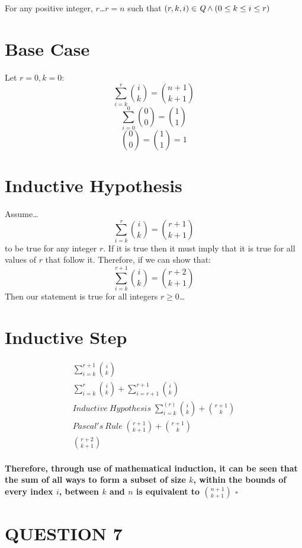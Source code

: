 \documentclass{amsart}
\theoremstyle{definition}
\theoremstyle{remark}
\numberwithin{equation}{section}
\begin{document}
\begin{itemize}
For any positive integer, $r$\dots\newline$r = n$ such that $(r,k,i) \in \emph{Q} \land (0 \leq k \leq i \leq r)$

\section*{Base Case}


Let $r = 0, k=0$: $$\sum_{i=k}^{r}{i \choose k} = {n+1 \choose k+1}$$ $$\sum_{i=0}^{0} {0 \choose 0} = {1 \choose 1}$$ $${0 \choose 0} =  {1 \choose 1} = 1$$
\section*{Inductive Hypothesis}
Assume\dots $$\sum_{i=k}^r {i \choose k} = { {r+1} \choose {k+1} }$$ to be true for any integer $r$. If it is true then it must imply that it is true for all values of $r$ that follow it. Therefore, if we can show that:
$$ \sum_{i=k}^{r+1} {i \choose k} = { r+2 \choose {k+1} } $$ 
Then our statement is true for all integers $r\geq 0$\dots

\section*{Inductive Step}

\end{itemize} 

\begin{align}
	\sum_{i=k}^{r+1} {i \choose k}  \\
	\sum_{i=k}^{r} {i \choose k} + \sum_{i=r+1}^{r+1} {i \choose k} \\
	Inductive\: Hypothesis \; \sum_{i=k}^{(r)} {i \choose k} + {r+1 \choose k}\\
	Pascal's\:Rule\; {r+1 \choose k+1} + {r + 1 \choose k} \\
	{r+2 \choose k+1} 
\end{align}
\setcounter{equation}{0}

\paragraph{Therefore, through use of mathematical induction, it can be seen that the sum of all ways to form a subset of size $k$, within the bounds of every index $i$, between $k$ and $n$ is equivalent to ${n+1 \choose k+1}$ $\square$}

\section*{QUESTION 7}
\end{document}
